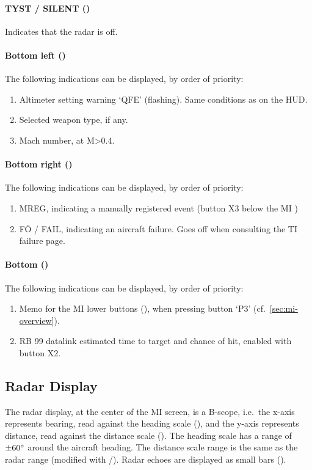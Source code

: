 \paragraph{TYST / SILENT ()}
Indicates that the radar is off.

\paragraph{Bottom left ()}
The following indications can be displayed, by order of priority:
\begin{enumerate}[nosep]
  \item Altimeter setting warning `QFE' (flashing). Same conditions as on the HUD.
  \item Selected weapon type, if any.
  \item Mach number, at M>0.4.
\end{enumerate}

\paragraph{Bottom right ()}
The following indications can be displayed, by order of priority:
\begin{enumerate}[nosep]
  \item MREG, indicating a manually registered event (button X3 below the MI )
  \item FÖ / FAIL, indicating an aircraft failure. Goes off when consulting the TI failure page.
\end{enumerate}

\paragraph{Bottom ()}
The following indications can be displayed, by order of priority:
\begin{enumerate}[nosep]
  \item Memo for the MI lower buttons (),
    when pressing button `P3' (cf.~\cref{sec:mi-overview}).
  \item RB 99 datalink estimated time to target and chance of hit,
    enabled with button X2.
\end{enumerate}

\subsection{Radar Display}
The radar display, at the center of the MI screen, is a B-scope,
i.e.\ the x-axis represents bearing, read against the heading scale (),
and the y-axis represents distance, read against the distance scale ().
The heading scale has a range of $\pm 60\degree$ around the aircraft heading.
The distance scale range is the same as the radar range (modified with \keys{[}/\keys{]}).
Radar echoes are displayed as small bars ().

